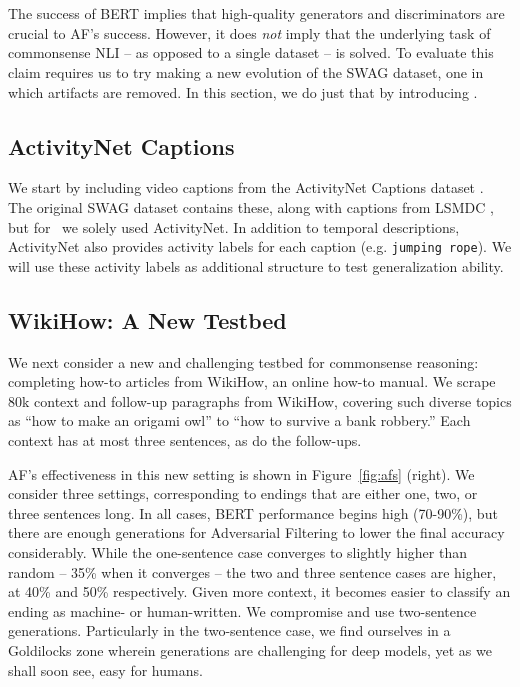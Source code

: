 \section{\Large {}}
\label{sec:hellaswag}

The success of BERT implies that high-quality generators and discriminators are crucial to AF's success. However, it does \emph{not} imply that the underlying task of commonsense NLI -- as opposed to a single dataset -- is solved. To evaluate this claim requires us to try making a new evolution of the SWAG dataset, one in which artifacts are removed. In this section, we do just that by introducing {}. 
\subsection{ActivityNet Captions} We start by including video captions from the ActivityNet Captions dataset \cite{krishna_dense-captioning_2017}. The original SWAG dataset contains these, along with captions from LSMDC \cite{rohrbach_movie_2017}, but for {}~we solely used ActivityNet. In addition to temporal descriptions, ActivityNet also provides activity labels for each caption (e.g. \texttt{jumping rope}). We will use these activity labels as additional structure to test generalization ability.

\subsection{WikiHow: A New Testbed} We next consider a new and challenging testbed for commonsense reasoning: completing how-to articles from WikiHow, an online how-to manual. We scrape 80k context and follow-up paragraphs from WikiHow, covering such diverse topics as ``how to make an origami owl'' to ``how to survive a bank robbery.'' Each context has at most three sentences, as do the follow-ups.

AF's effectiveness in this new setting is shown in Figure~\ref{fig:afs} (right). We consider three settings, corresponding to endings that are either one, two, or three sentences long. In all cases, BERT performance begins high (70-90\%), but there are enough generations for Adversarial Filtering to lower the final accuracy considerably. While the one-sentence case converges to slightly higher than random -- 35\% when it converges -- the two and three sentence cases are higher, at 40\% and 50\% respectively. Given more context, it becomes easier to classify an ending as machine- or human-written. We compromise and use two-sentence generations. Particularly in the two-sentence case, we find ourselves in a Goldilocks zone wherein generations are challenging for deep models, yet as we shall soon see, easy for humans.

